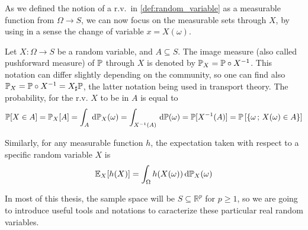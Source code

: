 \documentclass[../../Main_ManuscritThese.tex]{subfiles}
\begin{document}
  
As we defined the notion of a r.v.\ in \cref{def:random_variable} as a measurable function from $\Omega \to S$, we can now focus on the measurable sets through $X$, by using in a sense the change of variable $x = X(\omega)$. 
\begin{definition}
  \label{def:image_measure}
  Let $X:\Omega \rightarrow S$ be a random variable, and $A \subseteq S$. The image measure (also called pushforward measure) of $\mathbb{P}$ through $X$ is denoted by $\mathbb{P}_X = \mathbb{P} \circ X^{-1}$. This notation can differ slightly depending on the community, so one can find also $ \mathbb{P}_X = \mathbb{P} \circ X^{-1} = X_{\sharp}\mathbb{P}$, the latter notation being used in transport theory. The probability, for the r.v. $X$ to be in $A$ is equal to
  \begin{equation}
    \mathbb{P}[X \in A] = \mathbb{P}_X[A] = \int_{A}\,\mathrm{d}\mathbb{P}_X(\omega) =  \int_{X^{-1}(A)}\,\mathrm{d}\mathbb{P}(\omega) = \mathbb{P}[X^{-1}(A)] = \mathbb{P}\left[\{\omega\,;\,X(\omega) \in A\}\right]
  \end{equation}
  
Similarly, for any measurable function $h$, the expectation taken with respect to a specific random variable $X$ is 
\begin{equation}
  \mathbb{E}_{X}[h(X)] = \int_{\Omega} h(X(\omega)) \,\mathrm{d}\mathbb{P}_{X}(\omega)
\end{equation}
\end{definition}



In most of this thesis, the sample space will be $S\subseteq \mathbb{R}^p$ for $p\geq 1$, so we are going to introduce useful tools and notations to caracterize these particular real random variables.
\end{document}
